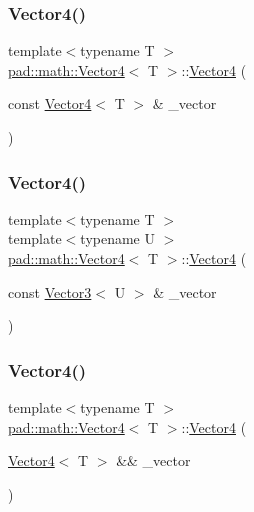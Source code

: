 \subsubsection{\texorpdfstring{Vector4()}{Vector4()}\hspace{0.1cm}{\footnotesize\ttfamily [3/5]}}
{\footnotesize\ttfamily template$<$typename T $>$ \\
\mbox{\hyperlink{structpad_1_1math_1_1_vector4}{pad\+::math\+::\+Vector4}}$<$ T $>$\+::\mbox{\hyperlink{structpad_1_1math_1_1_vector4}{Vector4}} (\begin{DoxyParamCaption}\item[{const \mbox{\hyperlink{structpad_1_1math_1_1_vector4}{Vector4}}$<$ T $>$ \&}]{\+\_\+vector }\end{DoxyParamCaption})}

\mbox{\label{structpad_1_1math_1_1_vector4_a8eff662101e960939085ce8033f9ddae}} 
\subsubsection{\texorpdfstring{Vector4()}{Vector4()}\hspace{0.1cm}{\footnotesize\ttfamily [4/5]}}
{\footnotesize\ttfamily template$<$typename T $>$ \\
template$<$typename U $>$ \\
\mbox{\hyperlink{structpad_1_1math_1_1_vector4}{pad\+::math\+::\+Vector4}}$<$ T $>$\+::\mbox{\hyperlink{structpad_1_1math_1_1_vector4}{Vector4}} (\begin{DoxyParamCaption}\item[{const \mbox{\hyperlink{structpad_1_1math_1_1_vector3}{Vector3}}$<$ U $>$ \&}]{\+\_\+vector }\end{DoxyParamCaption})}

\mbox{\label{structpad_1_1math_1_1_vector4_acc4699e8164a36ac16bac91357f8e7cd}} 
\subsubsection{\texorpdfstring{Vector4()}{Vector4()}\hspace{0.1cm}{\footnotesize\ttfamily [5/5]}}
{\footnotesize\ttfamily template$<$typename T $>$ \\
\mbox{\hyperlink{structpad_1_1math_1_1_vector4}{pad\+::math\+::\+Vector4}}$<$ T $>$\+::\mbox{\hyperlink{structpad_1_1math_1_1_vector4}{Vector4}} (\begin{DoxyParamCaption}\item[{\mbox{\hyperlink{structpad_1_1math_1_1_vector4}{Vector4}}$<$ T $>$ \&\&}]{\+\_\+vector }\end{DoxyParamCaption})\hspace{0.3cm}{\ttfamily [default]}}

